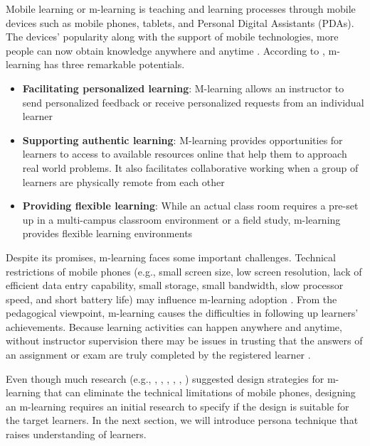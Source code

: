 \documentclass[a4paper,twoside]{article}
\renewcommand{\cite}{\citep}
\begin{document}
\noindent Mobile learning or m-learning is teaching and learning processes through mobile devices such as mobile phones, tablets, and Personal Digital Assistants (PDAs). The devices' popularity along with the support of mobile technologies, more people can now obtain knowledge anywhere and anytime \citep{liu2010understanding}. According to \citet{traxler2007defining}, m-learning has three remarkable potentials. 
\begin{itemize}
\item \textbf{Facilitating personalized learning}: M-learning allows an instructor to send personalized feedback or receive personalized requests from an individual learner
\item \textbf{Supporting authentic learning}: M-learning provides opportunities for learners to access to available resources online that help them to approach real world problems. It also facilitates collaborative working when a group of learners are physically remote from each other
\item \textbf{Providing flexible learning}: While an actual class room requires a pre-set up in a multi-campus classroom environment or a field study, m-learning provides flexible learning environments
\end{itemize}

Despite its promises, m-learning faces some important challenges. Technical restrictions of mobile phones (e.g., small screen size, low screen resolution, lack of efficient data entry capability, small storage, small bandwidth, slow processor speed, and short battery life) may influence m-learning adoption \citep{liu2010understanding}. From the pedagogical viewpoint, m-learning causes the difficulties in following up learners' achievements. Because learning activities can happen anywhere and anytime, without instructor supervision there may be issues in trusting that the answers of an assignment or exam are truly completed by the registered learner \cite{shudong2005limitations}. 

Even though much research (e.g., \citet{alshalabi2012effective}, \citet{melhuish2010looking}, \citet{crow2010switching}, \citet{cochrane2010smartphones},  \citet{jones2006mobile}, \citet{jones2004please}) suggested design strategies for m-learning that can eliminate the technical limitations of mobile phones, designing an m-learning requires an initial research to specify if the design is suitable for the target learners. In the next section, we will introduce persona technique that raises understanding of learners. 
\end{document}
